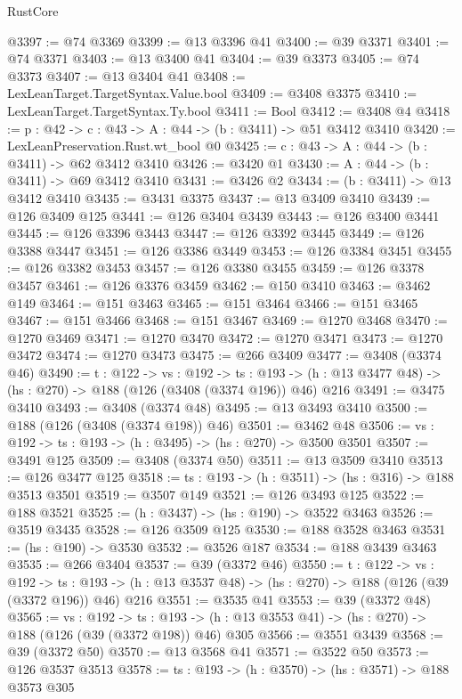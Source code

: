\begin{lexlean}{RustCore}
\begin{coremodule}
@3397 := @74 @3369
@3399 := @13 @3396 @41
@3400 := @39 @3371
@3401 := @74 @3371
@3403 := @13 @3400 @41
@3404 := @39 @3373
@3405 := @74 @3373
@3407 := @13 @3404 @41
@3408 := LexLeanTarget.TargetSyntax.Value.bool
@3409 := @3408 @3375
@3410 := LexLeanTarget.TargetSyntax.Ty.bool
@3411 := Bool
@3412 := @3408 @4
@3418 := {p : @42} -> {c : @43} -> {A : @44} -> (b : @3411) -> @51 @3412 @3410
@3420 := LexLeanPreservation.Rust.wt_bool @0
@3425 := {c : @43} -> {A : @44} -> (b : @3411) -> @62 @3412 @3410
@3426 := @3420 @1
@3430 := {A : @44} -> (b : @3411) -> @69 @3412 @3410
@3431 := @3426 @2
@3434 := (b : @3411) -> @13 @3412 @3410
@3435 := @3431 @3375
@3437 := @13 @3409 @3410
@3439 := @126 @3409 @125
@3441 := @126 @3404 @3439
@3443 := @126 @3400 @3441
@3445 := @126 @3396 @3443
@3447 := @126 @3392 @3445
@3449 := @126 @3388 @3447
@3451 := @126 @3386 @3449
@3453 := @126 @3384 @3451
@3455 := @126 @3382 @3453
@3457 := @126 @3380 @3455
@3459 := @126 @3378 @3457
@3461 := @126 @3376 @3459
@3462 := @150 @3410
@3463 := @3462 @149
@3464 := @151 @3463
@3465 := @151 @3464
@3466 := @151 @3465
@3467 := @151 @3466
@3468 := @151 @3467
@3469 := @1270 @3468
@3470 := @1270 @3469
@3471 := @1270 @3470
@3472 := @1270 @3471
@3473 := @1270 @3472
@3474 := @1270 @3473
@3475 := @266 @3409
@3477 := @3408 (@3374 @46)
@3490 := {t : @122} ->
  {vs : @192} ->
  {ts : @193} -> (h : @13 @3477 @48) -> (hs : @270) -> @188 (@126 (@3408 (@3374 @196)) @46) @216
@3491 := @3475 @3410
@3493 := @3408 (@3374 @48)
@3495 := @13 @3493 @3410
@3500 := @188 (@126 (@3408 (@3374 @198)) @46)
@3501 := @3462 @48
@3506 := {vs : @192} -> {ts : @193} -> (h : @3495) -> (hs : @270) -> @3500 @3501
@3507 := @3491 @125
@3509 := @3408 (@3374 @50)
@3511 := @13 @3509 @3410
@3513 := @126 @3477 @125
@3518 := {ts : @193} -> (h : @3511) -> (hs : @316) -> @188 @3513 @3501
@3519 := @3507 @149
@3521 := @126 @3493 @125
@3522 := @188 @3521
@3525 := (h : @3437) -> (hs : @190) -> @3522 @3463
@3526 := @3519 @3435
@3528 := @126 @3509 @125
@3530 := @188 @3528 @3463
@3531 := (hs : @190) -> @3530
@3532 := @3526 @187
@3534 := @188 @3439 @3463
@3535 := @266 @3404
@3537 := @39 (@3372 @46)
@3550 := {t : @122} ->
  {vs : @192} ->
  {ts : @193} -> (h : @13 @3537 @48) -> (hs : @270) -> @188 (@126 (@39 (@3372 @196)) @46) @216
@3551 := @3535 @41
@3553 := @39 (@3372 @48)
@3565 := {vs : @192} ->
  {ts : @193} -> (h : @13 @3553 @41) -> (hs : @270) -> @188 (@126 (@39 (@3372 @198)) @46) @305
@3566 := @3551 @3439
@3568 := @39 (@3372 @50)
@3570 := @13 @3568 @41
@3571 := @3522 @50
@3573 := @126 @3537 @3513
@3578 := {ts : @193} -> (h : @3570) -> (hs : @3571) -> @188 @3573 @305

\end{coremodule}
\end{lexlean}
